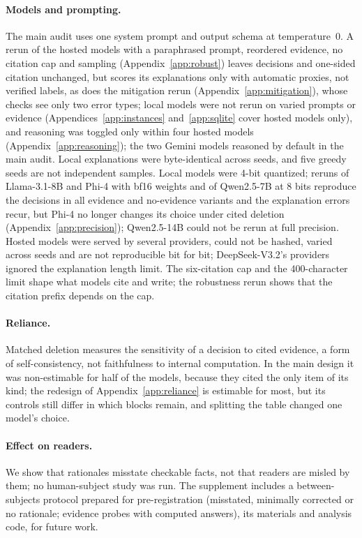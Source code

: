 \paragraph{Models and prompting.}
The main audit uses one system prompt and output schema at temperature~0. A rerun of the hosted models with a paraphrased prompt, reordered evidence, no citation cap and sampling (Appendix~\ref{app:robust}) leaves decisions and one-sided citation unchanged, but scores its explanations only with automatic proxies, not verified labels, as does the mitigation rerun (Appendix~\ref{app:mitigation}), whose checks see only two error types; local models were not rerun on varied prompts or evidence (Appendices~\ref{app:instances} and~\ref{app:sqlite} cover hosted models only), and reasoning was toggled only within four hosted models (Appendix~\ref{app:reasoning}); the two Gemini models reasoned by default in the main audit. Local explanations were byte-identical across seeds, and five greedy seeds are not independent samples. Local models were 4-bit quantized; reruns of Llama-3.1-8B and Phi-4 with bf16 weights and of Qwen2.5-7B at 8 bits reproduce the decisions in all evidence and no-evidence variants and the explanation errors recur, but Phi-4 no longer changes its choice under cited deletion (Appendix~\ref{app:precision}); Qwen2.5-14B could not be rerun at full precision. Hosted models were served by several providers, could not be hashed, varied across seeds and are not reproducible bit for bit; DeepSeek-V3.2's providers ignored the explanation length limit. The six-citation cap and the 400-character limit shape what models cite and write; the robustness rerun shows that the citation prefix depends on the cap.

\paragraph{Reliance.}
Matched deletion measures the sensitivity of a decision to cited evidence, a form of self-consistency, not faithfulness to internal computation. In the main design it was non-estimable for half of the models, because they cited the only item of its kind; the redesign of Appendix~\ref{app:reliance} is estimable for most, but its controls still differ in which blocks remain, and splitting the table changed one model's choice.

\paragraph{Effect on readers.}
We show that rationales misstate checkable facts, not that readers are misled by them; no human-subject study was run. The supplement includes a between-subjects protocol prepared for pre-registration (misstated, minimally corrected or no rationale; evidence probes with computed answers), its materials and analysis code, for future work.

